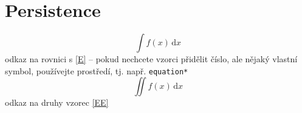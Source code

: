 \chapter{Persistence}

\begin{equation*}\label{E}\tag{rovnice}
 \int\! f(x)\,\mathrm{d}x
\end{equation*}
odkaz na rovnici s  \eqref{E} -- pokud nechcete vzorci přidělit číslo, ale nějaký vlastní symbol, používejte
 prostředí, tj. např. \verb+equation*+
\begin{equation}\label{EE}
 \iint\! f(x)\,\mathrm{d}x
\end{equation}
odkaz na druhy vzorec \eqref{EE}
